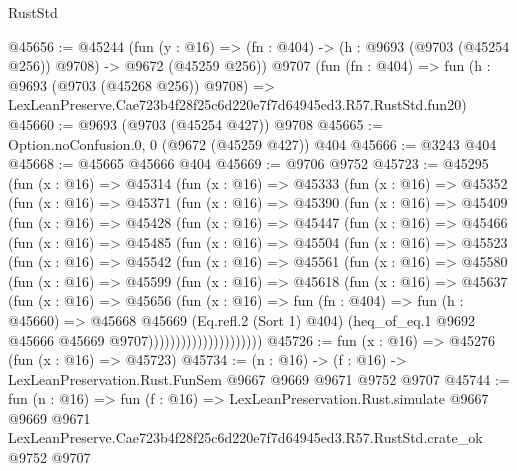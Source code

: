 \begin{lexlean}{RustStd}
\begin{coremodule}
@45656 := @45244
    (fun (y : @16) => (fn : @404) -> (h : @9693 (@9703 (@45254 @256)) @9708) -> @9672 (@45259 @256))
    @9707
    (fun (fn : @404) =>
    fun (h : @9693 (@9703 (@45268 @256)) @9708) =>
    LexLeanPreserve.Cae723b4f28f25c6d220e7f7d64945ed3.R57.RustStd.fun20)
@45660 := @9693 (@9703 (@45254 @427)) @9708
@45665 := Option.noConfusion.{0, 0} (@9672 (@45259 @427)) @404
@45666 := @3243 @404
@45668 := @45665 @45666 @404
@45669 := @9706 @9752
@45723 := @45295
    (fun (x : @16) =>
    @45314
      (fun (x : @16) =>
      @45333
        (fun (x : @16) =>
        @45352
          (fun (x : @16) =>
          @45371
            (fun (x : @16) =>
            @45390
              (fun (x : @16) =>
              @45409
                (fun (x : @16) =>
                @45428
                  (fun (x : @16) =>
                  @45447
                    (fun (x : @16) =>
                    @45466
                      (fun (x : @16) =>
                      @45485
                        (fun (x : @16) =>
                        @45504
                          (fun (x : @16) =>
                          @45523
                            (fun (x : @16) =>
                            @45542
                              (fun (x : @16) =>
                              @45561
                                (fun (x : @16) =>
                                @45580
                                  (fun (x : @16) =>
                                  @45599
                                    (fun (x : @16) =>
                                    @45618
                                      (fun (x : @16) =>
                                      @45637
                                        (fun (x : @16) =>
                                        @45656
                                          (fun (x : @16) =>
                                          fun (fn : @404) =>
                                          fun (h : @45660) =>
                                          @45668
                                            @45669
                                            (Eq.refl.{2} (Sort 1) @404)
                                            (heq_of_eq.{1}
                                              @9692
                                              @45666
                                              @45669
                                              @9707)))))))))))))))))))))
@45726 := fun (x : @16) => @45276 (fun (x : @16) => @45723)
@45734 := (n : @16) -> (f : @16) -> LexLeanPreservation.Rust.FunSem @9667 @9669 @9671 @9752 @9707
@45744 := fun (n : @16) =>
  fun (f : @16) =>
  LexLeanPreservation.Rust.simulate
    @9667
    @9669
    @9671
    LexLeanPreserve.Cae723b4f28f25c6d220e7f7d64945ed3.R57.RustStd.crate_ok
    @9752
    @9707
\end{coremodule}
\end{lexlean}
